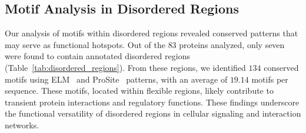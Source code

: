 \begin{table}[H]
    \centering
    \caption{Top 10 enriched GO terms and their branches}
    \label{tab:go_terms}
\end{table}

\subsection{Motif Analysis in Disordered Regions}
Our analysis of motifs within disordered regions revealed conserved patterns that may serve as functional hotspots. Out of the $83$ proteins analyzed, only seven were found to contain annotated disordered regions~\cite{mobidb} (Table~\ref{tab:disordered_regions}). From these regions, we identified $134$ conserved motifs using ELM~\cite{elm} and ProSite~\cite{prosite} patterns, with an average of $19.14$ motifs per sequence. These motifs, located within flexible regions, likely contribute to transient protein interactions and regulatory functions. These findings underscore the functional versatility of disordered regions in cellular signaling and interaction networks.

